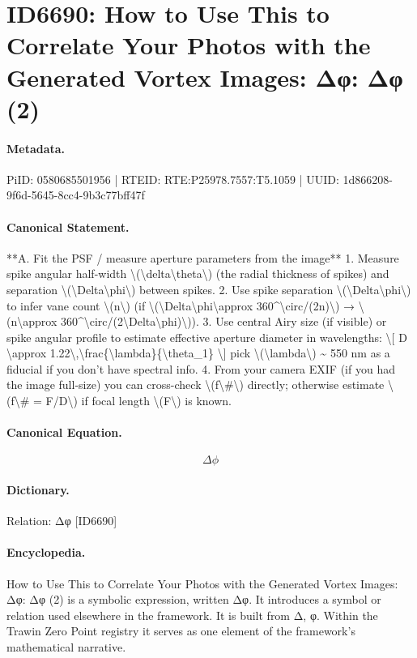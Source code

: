 \section*{ID6690: How to Use This to Correlate Your Photos with the Generated Vortex Images: Δφ: Δφ (2)}
\paragraph{Metadata.}
PiID: 0580685501956 | RTEID: RTE:P25978.7557:T5.1059 | UUID: 1d866208-9f6d-5645-8cc4-9b3c77bff47f

\paragraph{Canonical Statement.}
**A. Fit the PSF / measure aperture parameters from the image** 1. Measure spike angular half-width \textbackslash{}(\textbackslash{}delta\textbackslash{}theta\textbackslash{}) (the radial thickness of spikes) and separation \textbackslash{}(\textbackslash{}Delta\textbackslash{}phi\textbackslash{}) between spikes. 2. Use spike separation \textbackslash{}(\textbackslash{}Delta\textbackslash{}phi\textbackslash{}) to infer vane count \textbackslash{}(n\textbackslash{}) (if \textbackslash{}(\textbackslash{}Delta\textbackslash{}phi\textbackslash{}approx 360\textasciicircum{}\textbackslash{}circ/(2n)\textbackslash{}) → \textbackslash{}(n\textbackslash{}approx 360\textasciicircum{}\textbackslash{}circ/(2\textbackslash{}Delta\textbackslash{}phi)\textbackslash{})). 3. Use central Airy size (if visible) or spike angular profile to estimate effective aperture diameter in wavelengths: \textbackslash{}[ D \textbackslash{}approx 1.22\textbackslash{},\textbackslash{}frac\{\textbackslash{}lambda\}\{\textbackslash{}theta\_1\} \textbackslash{}] pick \textbackslash{}(\textbackslash{}lambda\textbackslash{}) \textasciitilde{} 550 nm as a fiducial if you don’t have spectral info. 4. From your camera EXIF (if you had the image full-size) you can cross-check \textbackslash{}(f\textbackslash{}\#\textbackslash{}) directly; otherwise estimate \textbackslash{}(f\textbackslash{}\# = F/D\textbackslash{}) if focal length \textbackslash{}(F\textbackslash{}) is known.

\paragraph{Canonical Equation.}
\[
\Delta\phi
\]

\paragraph{Dictionary.}
Relation: Δφ [ID6690]

\paragraph{Encyclopedia.}
How to Use This to Correlate Your Photos with the Generated Vortex Images: Δφ: Δφ (2) is a symbolic expression, written Δφ. It introduces a symbol or relation used elsewhere in the framework. It is built from Δ, φ. Within the Trawin Zero Point registry it serves as one element of the framework's mathematical narrative.
